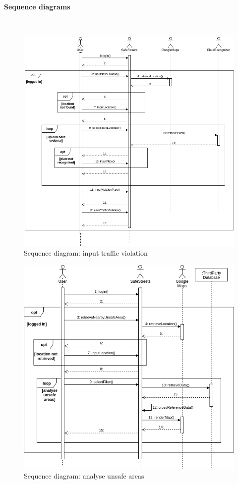 \documentclass{article}
\begin{document}
\newpage
\paragraph{Sequence diagrams}\mbox{}\\
\begin{figure}[H]
    \centering
    \includegraphics[scale=0.45]{Images/SequenceReportViolation}
    \caption{Sequence diagram: input traffic violation}
\end{figure}

\begin{figure}[H]
    \centering
    \includegraphics[scale=0.5]{Images/SequenceUserAnalyseUnsafeAreas} 
    \caption{Sequence diagram: analyse unsafe areas}
\end{figure}
\newpage
\end{document}
